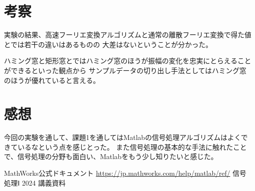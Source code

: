 \documentclass[a4paper,11pt]{ltjsarticle}
\begin{document}
\section{考察}
実験の結果、高速フーリエ変換アルゴリズムと通常の離散フーリエ変換で得た値とでは若干の違いはあるものの
大差はないということが分かった。

ハミング窓と矩形窓とではハミング窓のほうが振幅の変化を忠実にとらえることができるといった観点から
サンプルデータの切り出し手法としてはハミング窓のほうが優れていると言える。
\section{感想}
今回の実験を通して、課題1を通してはMatlabの信号処理アルゴリズムはよくできているなという点を感じとった。
また信号処理の基本的な手法に触れたことで、信号処理の分野も面白い、Matlabをもう少し知りたいと感じた。

\begin{thebibliography}{9}
	 MathWorks公式ドキュメント \url{https://jp.mathworks.com/help/matlab/ref/}
	 信号処理Ⅰ 2024 講義資料
\end{thebibliography}
\end{document}
